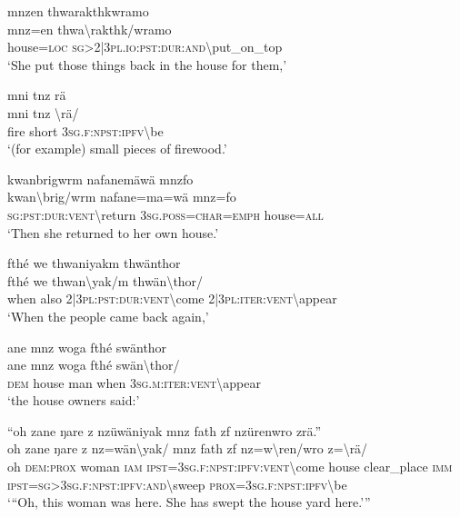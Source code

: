 \ea\label{ex:7:a4696}
mnzen thwarakthkwramo\\
\gll mnz=en	thwa{\textbackslash}rakthk/wramo\\
     house=\textsc{loc}	\textsc{sg}>2|3\textsc{pl}.\textsc{io}:\textsc{pst}:\textsc{dur}:\textsc{and}{\textbackslash}put\_on\_top\\
\glt `She put those things back in the house for them,'
\z

\ea\label{ex:7:a4697}
mni tnz rä\\
\gll mni	tnz	{\textbackslash}rä/\\
     fire	short	3\textsc{sg}.\textsc{f}:\textsc{npst}:\textsc{ipfv}{\textbackslash}be\\
\glt `(for example) small pieces of firewood.'
\z

\ea\label{ex:7:a4698}
kwanbrigwrm nafanemäwä mnzfo\\
\gll kwan{\textbackslash}brig/wrm	nafane=ma=wä	mnz=fo\\
     \textsc{sg}:\textsc{pst}:\textsc{dur}:\textsc{vent}{\textbackslash}return	3\textsc{sg}.\textsc{poss}=\textsc{char}=\textsc{emph}	house=\textsc{all}\\
\glt `Then she returned to her own house.'
\z

\ea\label{ex:7:a4700}
fthé we thwaniyakm thwänthor\\
\gll fthé	we	thwan{\textbackslash}yak/m	thwän{\textbackslash}thor/\\
     when	also	2|3\textsc{pl}:\textsc{pst}:\textsc{dur}:\textsc{vent}{\textbackslash}come	2|3\textsc{pl}:\textsc{iter}:\textsc{vent}{\textbackslash}appear\\
\glt `When the people came back again,'
\z

\ea\label{ex:7:a4701}
ane mnz woga fthé swänthor\\
\gll ane	mnz	woga	fthé	swän{\textbackslash}thor/\\
     \textsc{dem}	house	man	when	3\textsc{sg}.\textsc{m}:\textsc{iter}:\textsc{vent}{\textbackslash}appear\\
\glt `the house owners said:'
\z

\ea\label{ex:7:a4702}
``oh zane ŋare z nzüwäniyak mnz fath zf nzürenwro zrä.''\\
\gll oh	zane	ŋare	z	nz=wän{\textbackslash}yak/	mnz	fath	zf	nz=w{\textbackslash}ren/wro	z={\textbackslash}rä/\\
     oh	\textsc{dem}:\textsc{prox}	woman	\textsc{iam}	\textsc{ipst}=3\textsc{sg}.\textsc{f}:\textsc{npst}:\textsc{ipfv}:\textsc{vent}{\textbackslash}come	house	clear\_place	\textsc{imm}	\textsc{ipst}=\textsc{sg}>3\textsc{sg}.\textsc{f}:\textsc{npst}:\textsc{ipfv}:\textsc{and}{\textbackslash}sweep	\textsc{prox}=3\textsc{sg}.\textsc{f}:\textsc{npst}:\textsc{ipfv}{\textbackslash}be\\
\glt `{``}Oh, this woman was here. She has swept the house yard here.'''
\z

